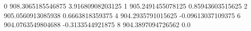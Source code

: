 0 908.3065185546875 3.91680908203125
1 905.2491455078125 0.85943603515625
2 905.0560913085938 0.6663818359375
4 904.2935791015625 -0.09613037109375
6 904.0763549804688 -0.3133544921875
8 904.3897094726562 0.0
